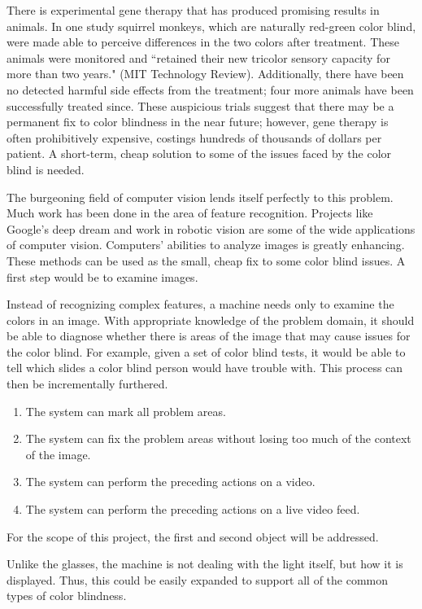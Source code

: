 \documentclass[12pt]{article}
\begin{document}
There is experimental gene therapy that has produced promising results in animals. In one study squirrel monkeys, which are naturally red-green color blind, were made able to perceive differences in the two colors after treatment. These animals were monitored and ``retained their new tricolor sensory capacity for more than two years." (MIT Technology Review). Additionally, there have been no detected harmful side effects from the treatment; four more animals have been successfully treated since. These auspicious trials suggest that there may be a permanent fix to color blindness in the near future; however, gene therapy is often prohibitively expensive, costings hundreds of thousands of dollars per patient. A short-term, cheap solution to some of the issues faced by the color blind is needed. 

The burgeoning field of computer vision lends itself perfectly to this problem. Much work has been done in the area of feature recognition. Projects like Google's deep dream and work in robotic vision are some of the wide applications of computer vision. Computers' abilities to analyze images is greatly enhancing. These methods can be used as the small, cheap fix to some color blind issues. A first step would be to examine images.

Instead of recognizing complex features, a machine needs only to examine the colors in an image. With appropriate knowledge of the problem domain, it should be able to diagnose whether there is areas of the image that may cause issues for the color blind. For example, given a set of color blind tests, it would be able to tell which slides a color blind person would have trouble with. This process can then be incrementally furthered.

\begin{enumerate}
	\item The system can mark all problem areas.
	\item The system can fix the problem areas without losing too much of the context of the image.
	\item The system can perform the preceding actions on a video.
	\item The system can perform the preceding actions on a live video feed.
\end{enumerate}

For the scope of this project, the first and second object will be addressed.

Unlike the glasses, the machine is not dealing with the light itself, but how it is displayed. Thus, this could be easily expanded to support all of the common types of color blindness. 
\end{document}
